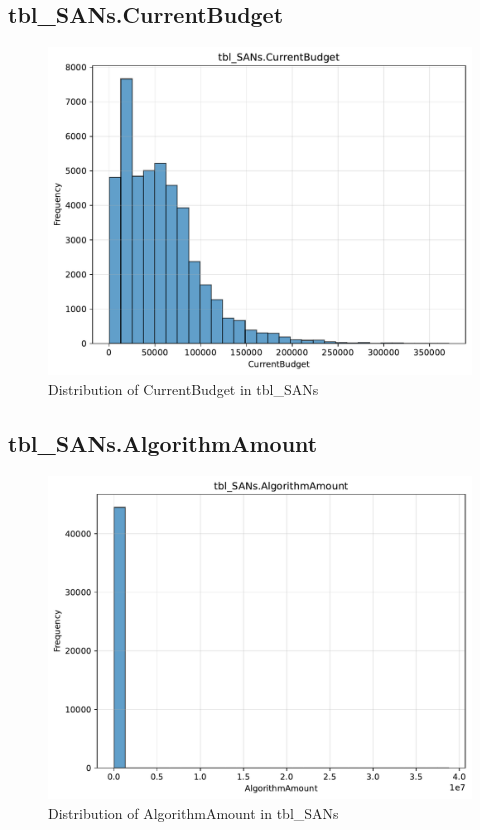 \subsection{tbl\_SANs.CurrentBudget}

\begin{figure}[htbp]
\centering
\includegraphics[width=\textwidth]{figures/dbo_tbl_SANs_CurrentBudget.pdf}
\caption{Distribution of CurrentBudget in tbl\_SANs}
\end{figure}\newpage

\subsection{tbl\_SANs.AlgorithmAmount}

\begin{figure}[htbp]
\centering
\includegraphics[width=\textwidth]{figures/dbo_tbl_SANs_AlgorithmAmount.pdf}
\caption{Distribution of AlgorithmAmount in tbl\_SANs}
\end{figure}\newpage

